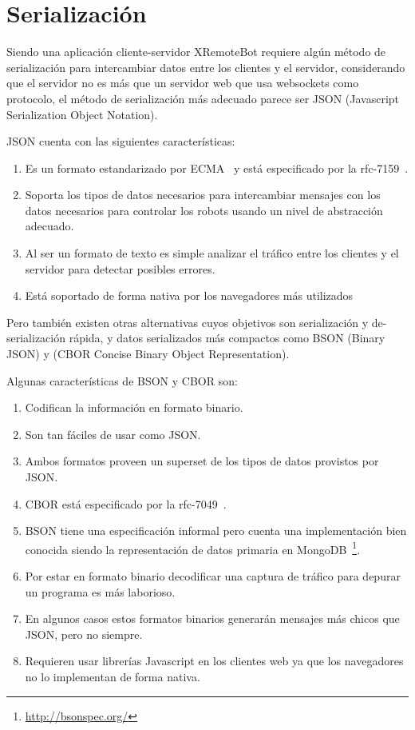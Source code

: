 
\chapter{Serialización}
\label{ch:serializacion}

Siendo una aplicación cliente-servidor XRemoteBot requiere algún método de
serialización para intercambiar datos entre los clientes y el servidor,
considerando que el servidor no es más que un servidor web que usa websockets
como protocolo, el método de serialización más adecuado parece ser JSON
(Javascript Serialization Object Notation).

JSON cuenta con las siguientes características:

\begin{enumerate}
    \item Es un formato estandarizado por ECMA~\citep{ecma-404}
        y está especificado por la rfc-7159~\citep{rfc-7159}.
    \item Soporta los tipos de datos necesarios para intercambiar mensajes con
        los datos necesarios para controlar los robots usando un nivel de
        abstracción adecuado.
    \item Al ser un formato de texto es simple analizar el tráfico entre los
        clientes y el servidor para detectar posibles errores.
    \item Está soportado de forma nativa por los navegadores más
        utilizados%
\end{enumerate}

Pero también existen otras alternativas cuyos objetivos son serialización
y de-serialización rápida, y datos serializados más compactos
como BSON (Binary JSON) y (CBOR Concise Binary Object Representation).

Algunas características de BSON y CBOR son:

\begin{enumerate}
    \item Codifican la información en formato binario.
    \item Son tan fáciles de usar como JSON.
    \item Ambos formatos proveen un superset de los tipos de datos provistos
        por JSON.
    \item CBOR está especificado por la rfc-7049~\citep{rfc-7049}.
    \item BSON tiene una especificación informal pero cuenta una
        implementación bien conocida siendo la representación de datos primaria en
        MongoDB~\footnote{\url{http://bsonspec.org/}}.
    \item Por estar en formato binario decodificar una captura de tráfico
        para depurar un programa es más laborioso.
    \item En algunos casos estos formatos binarios generarán mensajes más
        chicos que JSON, pero no siempre.
    \item Requieren usar librerías Javascript en los clientes web ya que los
        navegadores no lo implementan de forma nativa.
\end{enumerate}

